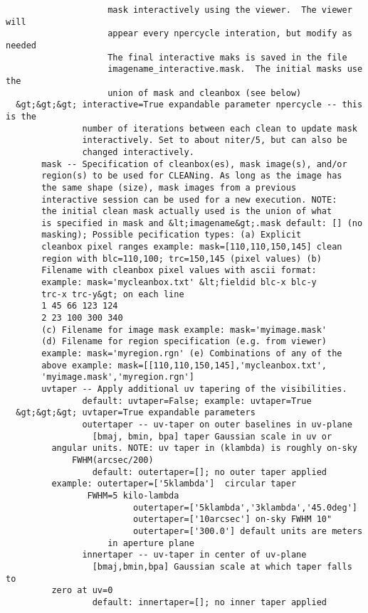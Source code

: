 \begin{verbatim}
                    mask interactively using the viewer.  The viewer will
                    appear every npercycle interation, but modify as needed
                    The final interactive maks is saved in the file
                    imagename_interactive.mask.  The initial masks use the
                    union of mask and cleanbox (see below)
  &gt;&gt;&gt; interactive=True expandable parameter npercycle -- this is the
               number of iterations between each clean to update mask
               interactively. Set to about niter/5, but can also be
               changed interactively.
       mask -- Specification of cleanbox(es), mask image(s), and/or
 	   region(s) to be used for CLEANing. As long as the image has
 	   the same shape (size), mask images from a previous
 	   interactive session can be used for a new execution. NOTE:
 	   the initial clean mask actually used is the union of what
 	   is specified in mask and &lt;imagename&gt;.mask default: [] (no
 	   masking); Possible pecification types: (a) Explicit
 	   cleanbox pixel ranges example: mask=[110,110,150,145] clean
 	   region with blc=110,100; trc=150,145 (pixel values) (b)
 	   Filename with cleanbox pixel values with ascii format:
 	   example: mask='mycleanbox.txt' &lt;fieldid blc-x blc-y
 	   trc-x trc-y&gt; on each line 
 	   1 45 66 123 124 
 	   2 23 100 300 340
 	   (c) Filename for image mask example: mask='myimage.mask'
 	   (d) Filename for region specification (e.g. from viewer)
 	   example: mask='myregion.rgn' (e) Combinations of any of the
 	   above example: mask=[[110,110,150,145],'mycleanbox.txt',
 	   'myimage.mask','myregion.rgn']
       uvtaper -- Apply additional uv tapering of the visibilities.
               default: uvtaper=False; example: uvtaper=True
  &gt;&gt;&gt; uvtaper=True expandable parameters
               outertaper -- uv-taper on outer baselines in uv-plane
                 [bmaj, bmin, bpa] taper Gaussian scale in uv or 
 		 angular units. NOTE: uv taper in (klambda) is roughly on-sky 
 	         FWHM(arcsec/200)
                 default: outertaper=[]; no outer taper applied
 		 example: outertaper=['5klambda']  circular taper 
 				FWHM=5 kilo-lambda
                         outertaper=['5klambda','3klambda','45.0deg']
                         outertaper=['10arcsec'] on-sky FWHM 10"
                         outertaper=['300.0'] default units are meters 
 			        in aperture plane
               innertaper -- uv-taper in center of uv-plane
                 [bmaj,bmin,bpa] Gaussian scale at which taper falls to 
 		 zero at uv=0
                 default: innertaper=[]; no inner taper applied

\end{verbatim}
